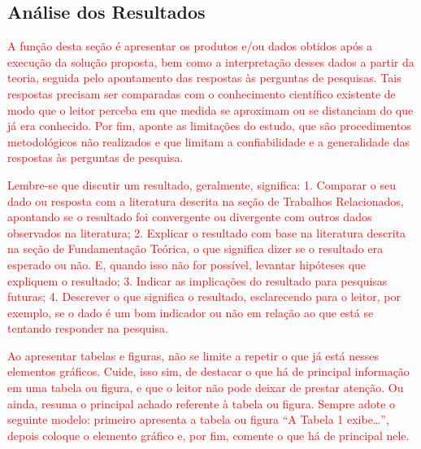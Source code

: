 

\subsection{Análise dos Resultados}
\label{sub:analise-resultados}

\textcolor{red}{A função desta seção é apresentar os produtos e/ou dados obtidos após a execução da solução proposta, bem como a interpretação desses dados a partir da teoria, seguida pelo apontamento das respostas às perguntas de pesquisas. Tais respostas precisam ser comparadas com o conhecimento científico existente de modo que o leitor perceba em que medida se aproximam ou se distanciam do que já era conhecido. Por fim, aponte as limitações do estudo, que são procedimentos metodológicos não realizados e que limitam a confiabilidade e a generalidade das respostas às perguntas de pesquisa.}

\textcolor{red}{Lembre-se que discutir um resultado, geralmente, significa: 1. Comparar o seu dado ou resposta com a literatura descrita na seção de Trabalhos Relacionados, apontando se o resultado foi convergente ou divergente com outros dados observados na literatura; 2. Explicar o resultado com base na literatura descrita na seção de Fundamentação Teórica, o que significa dizer se o resultado era esperado ou não. E, quando isso não for possível, levantar hipóteses que expliquem o resultado; 3. Indicar as implicações do resultado para pesquisas futuras; 4. Descrever o que significa o resultado, esclarecendo para o leitor, por exemplo, se o dado é um bom indicador ou não em relação ao que está se tentando responder na pesquisa.}

\textcolor{red}{Ao apresentar tabelas e figuras, não se limite a repetir o que já está nesses elementos gráficos. Cuide, isso sim, de destacar o que há de principal informação em uma tabela ou figura, e que o leitor não pode deixar de prestar atenção. Ou ainda, resuma o principal achado referente à tabela ou figura. Sempre adote o seguinte modelo: primeiro apresenta a tabela ou figura {“A Tabela 1 exibe…”}, depois coloque o elemento gráfico e, por fim, comente o que há de principal nele.}